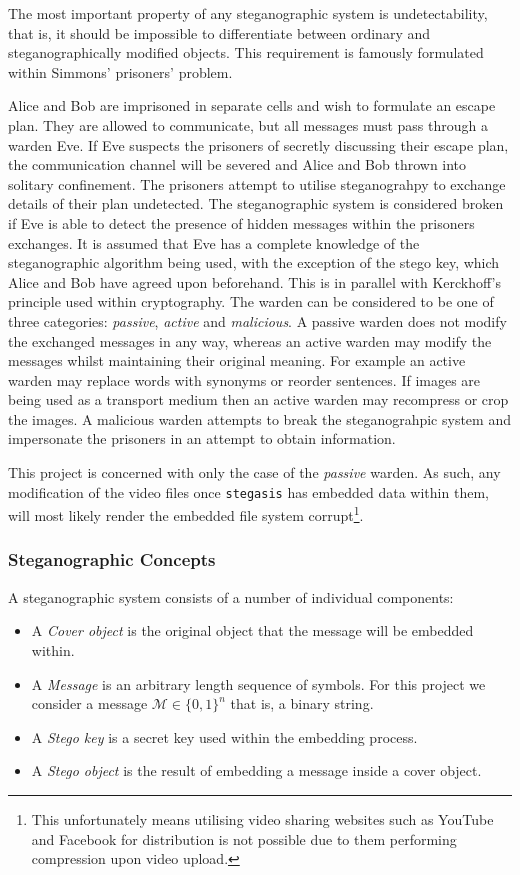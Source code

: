 \documentclass[paper=a4, fontsize=11pt,twoside]{scrartcl}    %
\numberwithin{table}{section}
\numberwithin{figure}{section}
\begin{document}
\noindent
The most important property of any steganographic system is undetectability, that is, it should be impossible to differentiate between ordinary and steganographically modified objects. This requirement is famously formulated within Simmons' prisoners' problem. 

Alice and Bob are imprisoned in separate cells and wish to formulate an escape plan. They are allowed to communicate, but all messages must pass through a warden Eve. If Eve suspects the prisoners of secretly discussing their escape plan, the communication channel will be severed and Alice and Bob thrown into solitary confinement. The prisoners attempt to utilise steganograhpy to exchange details of their plan undetected. The steganographic system is considered broken if Eve is able to detect the presence of hidden messages within the prisoners exchanges. It is assumed that Eve has a complete knowledge of the steganographic algorithm being used, with the exception of the stego key, which Alice and Bob have agreed upon beforehand. This is in parallel with Kerckhoff's principle used within cryptography. The warden can be considered to be one of three categories: \textit{passive}, \textit{active} and \textit{malicious}. A passive warden does not modify the exchanged messages in any way, whereas an active warden may modify the messages whilst maintaining their original meaning. For example an active warden may replace words with synonyms or reorder sentences. If images are being used as a transport medium then an active warden may recompress or crop the images. A malicious warden attempts to break the steganograhpic system and impersonate the prisoners in an attempt to obtain information.

This project is concerned with only the case of the \textit{passive} warden. As such, any modification of the video files once \texttt{stegasis} has embedded data within them, will most likely render the embedded file system corrupt\footnote{This unfortunately means utilising video sharing websites such as YouTube and Facebook for distribution is not possible due to them performing compression upon video upload.}.


\subsubsection{Steganographic Concepts}
A steganographic system consists of a number of individual components:
\begin{itemize}
	\item A \textit{Cover object} is the original object that the message will be embedded within.
	\item A \textit{Message} is an arbitrary length sequence of symbols. For this project we consider a message $\mathcal{M} \in \{0,1\}^{n} $ that is, a binary string.
	\item A \textit{Stego key} is a secret key used within the embedding process.
	\item A \textit{Stego object} is the result of embedding a message inside a cover object.
\end{itemize}
\end{document}
